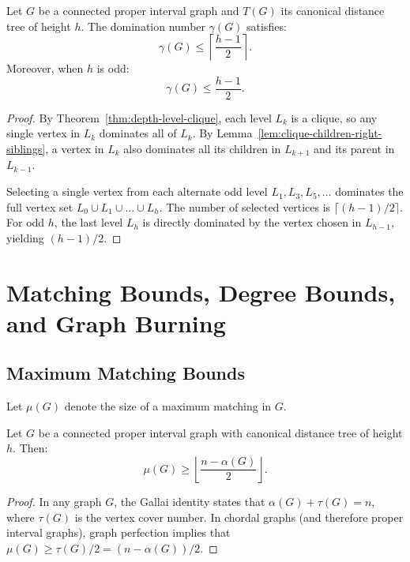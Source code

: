 \begin{theorem}
\label{thm:dominating-set-bound}
Let $G$ be a connected proper interval graph and $T(G)$ its canonical distance tree of height $h$. The domination number $\gamma(G)$ satisfies:
\begin{equation}
    \gamma(G) \le \left\lceil \frac{h-1}{2} \right\rceil.
\end{equation}
Moreover, when $h$ is odd:
\begin{equation}
    \gamma(G) \le \frac{h-1}{2}.
\end{equation}
\end{theorem}
\begin{proof}
By Theorem~\ref{thm:depth-level-clique}, each level $L_k$ is a clique, so any single vertex in $L_k$ dominates all of $L_k$. By Lemma~\ref{lem:clique-children-right-siblings}, a vertex in $L_k$ also dominates all its children in $L_{k+1}$ and its parent in $L_{k-1}$. 

Selecting a single vertex from each alternate odd level $L_1, L_3, L_5, \dots$ dominates the full vertex set $L_0 \cup L_1 \cup \dots \cup L_h$. The number of selected vertices is $\lceil (h-1)/2 \rceil$. For odd $h$, the last level $L_h$ is directly dominated by the vertex chosen in $L_{h-1}$, yielding $(h-1)/2$.
\end{proof}

\section{Matching Bounds, Degree Bounds, and Graph Burning}
\label{sec:struct_matching_burning}

\subsection{Maximum Matching Bounds}

Let $\mu(G)$ denote the size of a maximum matching in $G$.

\begin{theorem}
\label{thm:matching-bounds}
Let $G$ be a connected proper interval graph with canonical distance tree of height $h$. Then:
\begin{equation}
    \mu(G) \ge \left\lfloor \frac{n - \alpha(G)}{2} \right\rfloor.
\end{equation}
\end{theorem}
\begin{proof}
In any graph $G$, the Gallai identity states that $\alpha(G) + \tau(G) = n$, where $\tau(G)$ is the vertex cover number. In chordal graphs (and therefore proper interval graphs), graph perfection implies that $\mu(G) \ge \tau(G) / 2 = (n - \alpha(G)) / 2$.
\end{proof}

